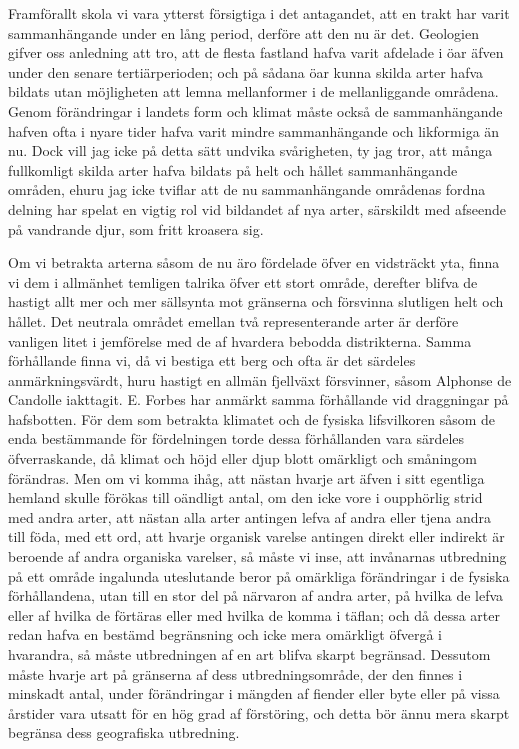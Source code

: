 Framförallt skola vi vara ytterst försigtiga i det antagandet, att en trakt har varit sammanhängande under en lång period, derföre att den nu är det. Geologien gifver oss anledning att tro, att de flesta fastland hafva varit afdelade i öar äfven under den senare tertiärperioden; och på sådana öar kunna skilda arter hafva bildats utan möjligheten att lemna mellanformer i de mellanliggande områdena. Genom förändringar i landets form och klimat måste också de sammanhängande hafven ofta i nyare tider hafva varit mindre sammanhängande och likformiga än nu. Dock vill jag icke på detta sätt undvika svårigheten, ty jag tror, att många fullkomligt skilda arter hafva bildats på helt och hållet sammanhängande områden, ehuru jag icke tviflar att de nu sammanhängande områdenas fordna delning har spelat en vigtig rol vid bildandet af nya arter, särskildt med afseende på vandrande djur, som fritt kroasera sig.

Om vi betrakta arterna såsom de nu äro fördelade öfver en vidsträckt yta, finna vi dem i allmänhet temligen talrika öfver ett stort område, derefter blifva de hastigt allt mer och mer sällsynta mot gränserna och försvinna slutligen helt och hållet. Det neutrala området emellan två representerande arter är derföre vanligen litet i jemförelse med de af hvardera bebodda distrikterna. Samma förhållande finna vi, då vi bestiga ett berg och ofta är det särdeles anmärkningsvärdt, huru hastigt en allmän fjellväxt försvinner, såsom Alphonse de Candolle iakttagit. E. Forbes har anmärkt samma förhållande vid draggningar på hafsbotten. För dem som betrakta klimatet och de fysiska lifsvilkoren såsom de enda bestämmande för fördelningen torde dessa förhållanden vara särdeles öfverraskande, då klimat och höjd eller djup blott omärkligt och småningom förändras. Men om vi komma ihåg, att nästan hvarje art äfven i sitt egentliga hemland skulle förökas till oändligt antal, om den icke vore i oupphörlig strid med andra arter, att nästan alla arter antingen lefva af andra eller tjena andra till föda, med ett ord, att hvarje organisk varelse antingen direkt eller indirekt är beroende af andra organiska varelser, så måste vi inse, att invånarnas utbredning på ett område ingalunda uteslutande beror på omärkliga förändringar i de fysiska förhållandena, utan till en stor del på närvaron af andra arter, på hvilka de lefva eller af hvilka de förtäras eller med hvilka de komma i täflan; och då dessa arter redan hafva en bestämd begränsning och icke mera omärkligt öfvergå i hvarandra, så måste utbredningen af en art blifva skarpt begränsad. Dessutom måste hvarje art på gränserna af dess utbredningsområde, der den finnes i minskadt antal, under förändringar i mängden af fiender eller byte eller på vissa årstider vara utsatt för en hög grad af förstöring, och detta bör ännu mera skarpt begränsa dess geografiska utbredning.


